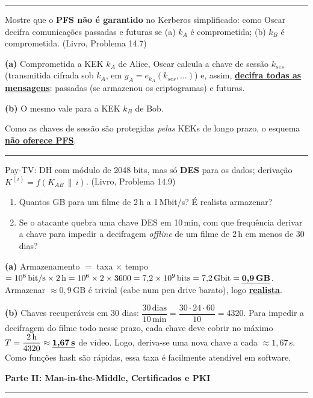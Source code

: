 \documentclass[11pt,a4paper]{article}
\newcommand{\livro}[1]{{\footnotesize\color{black!50}(Livro, Problema #1)}}
\newcommand{\alert}[1]{\textbf{\uline{#1}}}
\newcommand{\parte}[1]{%
    \par\vspace{1.6em}\noindent
    {\large\bfseries\color{red!55!black}#1}%
    \par\nobreak\vspace{-0.4em}\noindent
    {\color{red!45!black}\rule{\linewidth}{1.0pt}}%
    \par\nobreak\vspace{0.2em}
}
\newcommand{\exercicio}[1]{%
    \Needspace{8\baselineskip}%
    \par\vspace{1.2em}
    \noindent
    {\color{black!55}\rule[-0.25em]{3pt}{1.6em}}%
    \hspace{0.6em}{\Large\bfseries Exerc\'{i}cio #1}
    \par\vspace{-0.4em}
    \noindent{\color{black!35}\rule{\textwidth}{0.4pt}}
    \par\vspace{0.35em}
}
\newenvironment{resposta}{%
    \begin{respostabox}
    \color{red!70!black}\sloppy
}{%
    \end{respostabox}
}
\begin{document}
\exercicio{4}
Mostre que o \textbf{PFS n\~{a}o \'{e} garantido} no Kerberos simplificado: como Oscar decifra comunica\c{c}\~{o}es passadas e futuras se (a) $k_A$ \'{e} comprometida; (b) $k_B$ \'{e} comprometida. \livro{14.7}
\begin{resposta}
\textbf{(a)} Comprometida a KEK $k_A$ de Alice, Oscar calcula a chave de sess\~{a}o $k_{ses}$ (transmitida cifrada sob $k_A$, em $y_A = e_{k_A}(k_{ses}, \dots)$) e, assim, \alert{decifra todas as mensagens}: passadas (se armazenou os criptogramas) e futuras.

\textbf{(b)} O mesmo vale para a KEK $k_B$ de Bob.

Como as chaves de sess\~{a}o s\~{a}o protegidas \emph{pelas} KEKs de longo prazo, o esquema \alert{n\~{a}o oferece PFS}.
\end{resposta}

\exercicio{5}
Pay-TV: DH com m\'{o}dulo de 2048 bits, mas s\'{o} \textbf{DES} para os dados; deriva\c{c}\~{a}o $K^{(i)} = f(K_{AB} \,\|\, i)$. \livro{14.9}
\begin{enumerate}[label=(\alph*)]
    \item Quantos GB para um filme de 2\,h a 1\,Mbit/s? \'{E} realista armazenar?
    \item Se o atacante quebra uma chave DES em 10\,min, com que frequ\^{e}ncia derivar a chave para impedir a decifragem \emph{offline} de um filme de 2\,h em menos de 30 dias?
\end{enumerate}
\begin{resposta}
\textbf{(a)} Armazenamento $=$ taxa $\times$ tempo $= 10^6\,\text{bit/s} \times 2\,\text{h} = 10^6 \times 2 \times 3600 = 7{,}2 \times 10^9\,\text{bits} = 7{,}2\,\text{Gbit} = \alert{0{,}9\,\text{GB}}$. Armazenar $\approx 0{,}9$\,GB \'{e} trivial (cabe num pen drive barato), logo \alert{realista}.

\textbf{(b)} Chaves recuper\'{a}veis em 30 dias: $\dfrac{30\,\text{dias}}{10\,\text{min}} = \dfrac{30 \cdot 24 \cdot 60}{10} = 4320$. Para impedir a decifragem do filme todo nesse prazo, cada chave deve cobrir no m\'{a}ximo $T = \dfrac{2\,\text{h}}{4320} \approx \alert{1{,}67\,\text{s}}$ de v\'{i}deo. Logo, deriva-se uma nova chave a cada $\approx 1{,}67$\,s. Como fun\c{c}\~{o}es hash s\~{a}o r\'{a}pidas, essa taxa \'{e} facilmente atend\'{i}vel em software.
\end{resposta}

\parte{Parte II: Man-in-the-Middle, Certificados e PKI}
\end{document}
